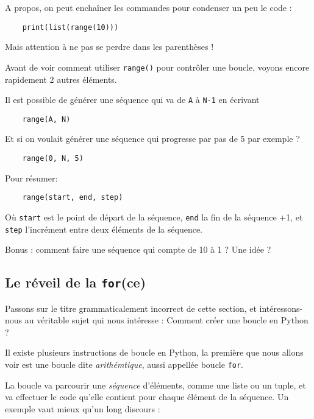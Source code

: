 A propos, on peut enchaîner les commandes pour condenser un peu le code :

\begin{lstlisting}
    print(list(range(10)))
\end{lstlisting}

Mais attention à ne pas se perdre dans les parenthèses !

Avant de voir comment utiliser \texttt{range()} pour contrôler une boucle, voyons encore rapidement 2 autres éléments.

Il est possible de générer une séquence qui va de \texttt{A} à \texttt{N-1} en écrivant

\begin{lstlisting}
    range(A, N)
\end{lstlisting}

Et si on voulait générer une séquence qui progresse par pas de 5 par exemple ?

\begin{lstlisting}
    range(0, N, 5)
\end{lstlisting}

Pour résumer:

\begin{lstlisting}
    range(start, end, step)
\end{lstlisting}

Où \texttt{start} est le point de départ de la séquence, \texttt{end} la fin de la séquence +1, et \texttt{step} l'incrément entre deux éléments de la séquence.

Bonus : comment faire une séquence qui compte de 10 à 1 ? Une idée ?

\subsection{Le réveil de la \texttt{for}(ce)}

Passons sur le titre grammaticalement incorrect de cette section, et intéressons-nous au véritable sujet qui nous intéresse : Comment créer une boucle en Python ?

Il existe plusieurs instructions de boucle en Python, la première que nous allons voir est une boucle dite \emph{arithémtique}, aussi appellée boucle \texttt{for}. 

La boucle  va parcourir une \emph{séquence} d'éléments, comme une liste ou un tuple, et va effectuer le code qu'elle contient pour chaque élément de la séquence. Un exemple vaut mieux qu'un long discours :

